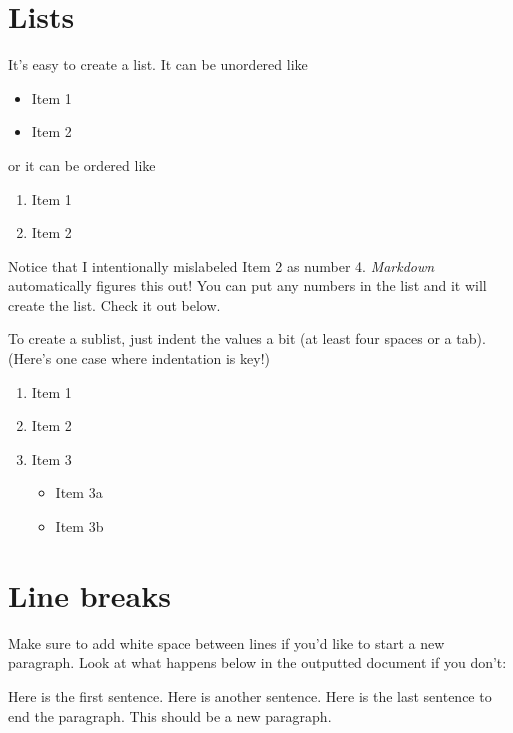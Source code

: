 \documentclass[
  letterpaper,
  12pt,
  twoside]{book}
\providecommand{\tightlist}{%
  \setlength{\itemsep}{0pt}\setlength{\parskip}{0pt}}
\begin{document}
\section{Lists}\label{lists}

It's easy to create a list. It can be unordered like

\begin{itemize}
\tightlist
\item
  Item 1
\item
  Item 2
\end{itemize}

or it can be ordered like

\begin{enumerate}
\def\labelenumi{\arabic{enumi}.}
\tightlist
\item
  Item 1
\item
  Item 2
\end{enumerate}

Notice that I intentionally mislabeled Item 2 as number 4.
\emph{Markdown} automatically figures this out! You can put any numbers
in the list and it will create the list. Check it out below.

To create a sublist, just indent the values a bit (at least four spaces
or a tab). (Here's one case where indentation is key!)

\begin{enumerate}
\def\labelenumi{\arabic{enumi}.}
\tightlist
\item
  Item 1
\item
  Item 2
\item
  Item 3

  \begin{itemize}
  \tightlist
  \item
    Item 3a
  \item
    Item 3b
  \end{itemize}
\end{enumerate}

\section{Line breaks}\label{line-breaks}

Make sure to add white space between lines if you'd like to start a new
paragraph. Look at what happens below in the outputted document if you
don't:

Here is the first sentence. Here is another sentence. Here is the last
sentence to end the paragraph. This should be a new paragraph.
\end{document}
